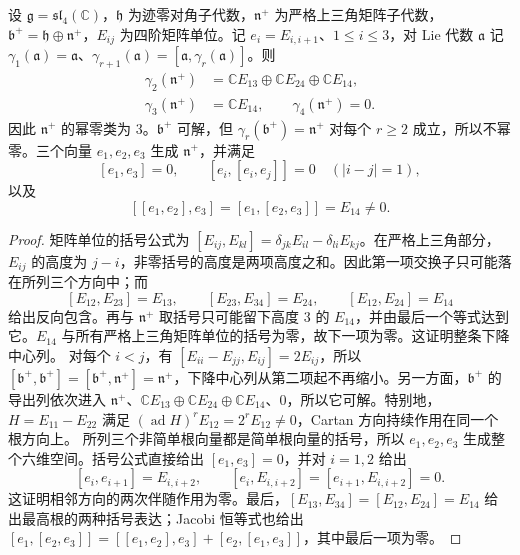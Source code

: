 \begin{proposition}\label{b5:prop:sl4-positive-root-algebra}
	设 \(\mathfrak g=\mathfrak{sl}_4(\mathbb C)\)，\(\mathfrak h\) 为迹零对角子代数，\(\mathfrak n^+\) 为严格上三角矩阵子代数，\(\mathfrak b^+=\mathfrak h\oplus\mathfrak n^+\)，\(E_{ij}\) 为四阶矩阵单位。记 \(e_i=E_{i,i+1}\)、\(1\le i\le3\)，对 Lie 代数 \(\mathfrak a\) 记 \(\gamma_1(\mathfrak a)=\mathfrak a\)、\(\gamma_{r+1}(\mathfrak a)=[\mathfrak a,\gamma_r(\mathfrak a)]\)。则
	\[
		\begin{aligned}
			\gamma_2(\mathfrak n^+)&=\mathbb CE_{13}\oplus\mathbb CE_{24}\oplus\mathbb CE_{14},\\
			\gamma_3(\mathfrak n^+)&=\mathbb CE_{14},\qquad \gamma_4(\mathfrak n^+)=0.
		\end{aligned}
	\]
	因此 \(\mathfrak n^+\) 的幂零类为 \(3\)。\(\mathfrak b^+\) 可解，但 \(\gamma_r(\mathfrak b^+)=\mathfrak n^+\) 对每个 \(r\ge2\) 成立，所以不幂零。三个向量 \(e_1,e_2,e_3\) 生成 \(\mathfrak n^+\)，并满足
	\[
		[e_1,e_3]=0,\qquad [e_i,[e_i,e_j]]=0\quad(|i-j|=1),
	\]
	以及
	\[
		[[e_1,e_2],e_3]=[e_1,[e_2,e_3]]=E_{14}\ne0.
	\]
\end{proposition}
\begin{proof}
	矩阵单位的括号公式为 \([E_{ij},E_{kl}]=\delta_{jk}E_{il}-\delta_{li}E_{kj}\)。在严格上三角部分，\(E_{ij}\) 的高度为 \(j-i\)，非零括号的高度是两项高度之和。因此第一项交换子只可能落在所列三个方向中；而
	\[
		[E_{12},E_{23}]=E_{13},\qquad [E_{23},E_{34}]=E_{24},\qquad [E_{12},E_{24}]=E_{14}
	\]
	给出反向包含。再与 \(\mathfrak n^+\) 取括号只可能留下高度 \(3\) 的 \(E_{14}\)，并由最后一个等式达到它。\(E_{14}\) 与所有严格上三角矩阵单位的括号为零，故下一项为零。这证明整条下降中心列。 对每个 \(i<j\)，有 \([E_{ii}-E_{jj},E_{ij}]=2E_{ij}\)，所以 \([\mathfrak b^+,\mathfrak b^+]=[\mathfrak b^+,\mathfrak n^+]=\mathfrak n^+\)，下降中心列从第二项起不再缩小。另一方面，\(\mathfrak b^+\) 的导出列依次进入 \(\mathfrak n^+\)、\(\mathbb CE_{13}\oplus\mathbb CE_{24}\oplus\mathbb CE_{14}\)、\(0\)，所以它可解。特别地，\(H=E_{11}-E_{22}\) 满足 \((\operatorname{ad}H)^rE_{12}=2^rE_{12}\ne0\)，Cartan 方向持续作用在同一个根方向上。 所列三个非简单根向量都是简单根向量的括号，所以 \(e_1,e_2,e_3\) 生成整个六维空间。括号公式直接给出 \([e_1,e_3]=0\)，并对 \(i=1,2\) 给出
	\[
		[e_i,e_{i+1}]=E_{i,i+2},\qquad [e_i,E_{i,i+2}]=[e_{i+1},E_{i,i+2}]=0.
	\]
	这证明相邻方向的两次伴随作用为零。最后，\([E_{13},E_{34}]=[E_{12},E_{24}]=E_{14}\) 给出最高根的两种括号表达；Jacobi 恒等式也给出 \([e_1,[e_2,e_3]]=[[e_1,e_2],e_3]+[e_2,[e_1,e_3]]\)，其中最后一项为零。
\end{proof}

